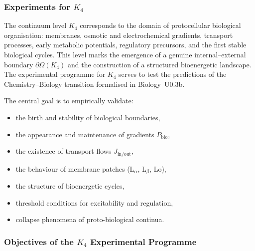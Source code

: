 
\subsubsection{Experiments for \texorpdfstring{$K_4$}{K_4}}
\label{sec:experiments-k4}

The continuum level $K_4$ corresponds to the domain of protocellular
biological organisation: membranes, osmotic and electrochemical
gradients, transport processes, early metabolic potentials,
regulatory precursors, and the first stable biological cycles.
This level marks the emergence of a genuine internal–external
boundary $\partial\Omega(K_4)$ and the construction of a structured
bioenergetic landscape.
The experimental programme for $K_4$ serves to test the
predictions of the Chemistry--Biology transition formalised in
Biology~U0.3b.

The central goal is to empirically validate:

\begin{itemize}
    \item the birth and stability of biological boundaries,
    \item the appearance and maintenance of gradients $P_{\mathrm{bio}}$,
    \item the existence of transport flows $J_{\mathrm{in/out}}$,
    \item the behaviour of membrane patches (L$_\alpha$, L$_\beta$, Lo),
    \item the structure of bioenergetic cycles,
    \item threshold conditions for excitability and regulation,
    \item collapse phenomena of proto-biological continua.
\end{itemize}



\subsubsection{Objectives of the \texorpdfstring{$K_4$}{K_4} Experimental Programme}

